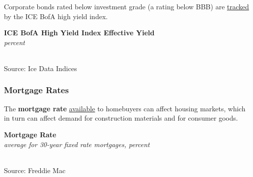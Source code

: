 \documentclass{report}
\makeatletter
\newcommand{\tbllink}[1]{\href{https://raw.githubusercontent.com/bdecon/US-chartbook/master/chartbook/data/#1}{\faTable}}
\newcommand*\short[1]{\expandafter\@gobbletwo\number\numexpr#1\relax}
\newcommand{\dateaxisticks}{
		date coordinates in=x, axis line style={draw=none},
		xmax={2023-10-01},
		max space between ticks=40,	    
		xtick={{1990-01-01}, {1992-01-01}, {1994-01-01}, 
			{1996-01-01}, {1998-01-01}, {2000-01-01}, 
			{2002-01-01}, {2004-01-01}, {2006-01-01},
			{2008-01-01}, {2010-01-01}, {2012-01-01}, {2014-01-01},
		    {2016-01-01}, {2018-01-01}, {2020-01-01}, {2022-01-01}, 
		    {2024-01-01}, {2026-01-01}},
		minor xtick={{1989-01-01}, {1991-01-01}, {1993-01-01},
			{1995-01-01}, {1997-01-01}, {1999-01-01}, 
			{2001-01-01}, {2003-01-01}, {2005-01-01}, {2007-01-01},
		    {2009-01-01}, {2011-01-01}, {2013-01-01}, {2015-01-01},
		    {2017-01-01}, {2019-01-01}, {2021-01-01}, {2023-01-01}, 
		    {2025-01-01}, {2027-01-01}},
		enlarge y limits={0.06}, enlarge x limits={0.01},
		}
\newcommand{\shdateaxisticks}{
		date coordinates in=x, axis line style={draw=none},
		xmax={2023-10-01},
		max space between ticks=40,	    
		xtick={{1990-01-01}, {1995-01-01}, {2000-01-01}, 
			{2005-01-01}, {2010-01-01}, {2015-01-01}, {2020-01-01}},
		minor xtick={},
		enlarge y limits={0.06}, enlarge x limits={0.01},
		}
\newcommand{\bbar}[2]{extra #1 ticks = {{#2}}, extra #1 tick labels = ,
		extra #1 tick style = {grid=major, grid style={thick, black!25}},}
\newcommand{\stdline}[4]{\addplot[very thick, no markers, color=#1] 
		table [x=#2, y=#3, col sep=comma] {#4};	}
\newcommand{\rbars}{
		\fill[color=black!10] (axis cs:{1990-07-01},\pgfkeysvalueof{/pgfplots/ymin}) rectangle 
			(axis cs:{1991-03-01}, \pgfkeysvalueof{/pgfplots/ymax});
		\fill[color=black!10] (axis cs:{2007-12-01},\pgfkeysvalueof{/pgfplots/ymin}) rectangle 
			(axis cs:{2009-07-01}, \pgfkeysvalueof{/pgfplots/ymax});
		\fill[color=black!10] (axis cs:{2001-03-01},\pgfkeysvalueof{/pgfplots/ymin}) rectangle 
			(axis cs:{2001-11-01}, \pgfkeysvalueof{/pgfplots/ymax});
		\fill[color=black!10] (axis cs:{2020-02-01},\pgfkeysvalueof{/pgfplots/ymin}) rectangle 
			(axis cs:{2020-05-01}, \pgfkeysvalueof{/pgfplots/ymax});}
\newcommand{\rebars}{
		\fill[color=black!10] (axis cs:{2007-12-01},\pgfkeysvalueof{/pgfplots/ymin}) rectangle 
			(axis cs:{2009-07-01}, \pgfkeysvalueof{/pgfplots/ymax});
		\fill[color=black!10] (axis cs:{2001-03-01},\pgfkeysvalueof{/pgfplots/ymin}) rectangle 
			(axis cs:{2001-11-01}, \pgfkeysvalueof{/pgfplots/ymax});
		\fill[color=black!10] (axis cs:{2020-02-01},\pgfkeysvalueof{/pgfplots/ymin}) rectangle 
			(axis cs:{2020-05-01}, \pgfkeysvalueof{/pgfplots/ymax});}
\makeatother
\begin{document}
{\begin{minipage}{0.76\textwidth}
\begin{minipage}{0.36\textwidth}
\small Corporate bonds rated below investment grade (a rating below BBB) are \href{https://fred.stlouisfed.org/series/BAMLH0A0HYM2EY}{tracked} by the ICE BofA high yield index. 
\end{minipage} \hfill \begin{minipage}{0.57\textwidth}
\normalsize \textbf{ICE BofA High Yield Index Effective Yield}\\
\footnotesize{\textit{percent}}\\
\hspace*{-2mm} \\
\footnotesize{Source: Ice Data Indices} \hfill \tbllink{highyield.csv}
\end{minipage}
\vspace{1mm}

\subsubsection*{Mortgage Rates} 
\vspace{-0.5mm}

\small The \textbf{mortgage rate} \href{https://www.freddiemac.com/pmms/pmms30}{available} to homebuyers can affect housing markets, which in turn can affect demand for construction materials and for consumer goods.  
\vspace{0.5mm} 

\normalsize \textbf{Mortgage Rate}\\
\footnotesize{\textit{average for 30-year fixed rate mortgages, percent}}\\
\hspace*{-2mm} \\
\footnotesize{Source: Freddie Mac} \hfill \tbllink{mortgage_mo.csv}
\end{minipage}
\newpage
\hypertarget{capmm}{\label{capmm}}
\begin{minipage}{0.76\textwidth}

\end{minipage}}
\end{document}
